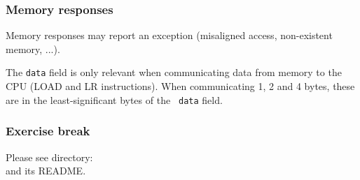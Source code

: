 \begin{frame}[fragile]
\frametitle{Memory responses}

\footnotesize

Memory responses may report an exception (misaligned access, non-existent memory, ...).

\vspace{1ex}


\vspace{4ex}


\vspace{1ex}

The {\tt data} field is only relevant when communicating data from
memory to the CPU (LOAD and LR instructions).  When communicating 1, 2
and 4 bytes, these are in the least-significant bytes of the {\tt
data} field.

\end{frame}


\begin{frame}
\frametitle{\EmojiExercise \hmm Exercise break}

Please see directory:  \\
and its README.

\end{frame}






